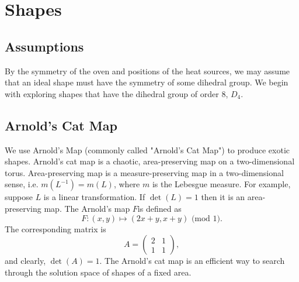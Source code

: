 \documentclass[12pt]{article}
\begin{document}
\section{Shapes}

\subsection{Assumptions}
By the symmetry of the oven and positions of the heat sources, we may assume that an ideal shape must have the symmetry of some dihedral group.
We begin with exploring shapes that have the dihedral group of order 8, $D_4$.

\subsection{Arnold's Cat Map}
We use Arnold's Map (commonly called "Arnold's Cat Map") to produce exotic shapes.
Arnold's cat map is a chaotic, area-preserving map on a two-dimensional torus.
\citep{hilborn}
Area-preserving map is a measure-preserving map in a two-dimensional sense, i.e. $m(L^{-1}) = m(L)$, where $m$ is the Lebesgue measure.
For example, suppose $L$ is a linear transformation.
If $\det(L) = 1$ then it is an area-preserving map.
The Arnold's map $F$is defined as
\begin{equation*}
  F: (x,y) \mapsto (2x + y, x + y) \mbox{ (mod 1)}.
\end{equation*}
The corresponding matrix is
\begin{equation*}
A =
\begin{pmatrix}
    2 & 1  \\
    1 & 1  
  \end{pmatrix},
\end{equation*}
and clearly, $\det(A) = 1$.
The Arnold's cat map is an efficient way to search through the solution space of shapes of a fixed area.
\end{document}
